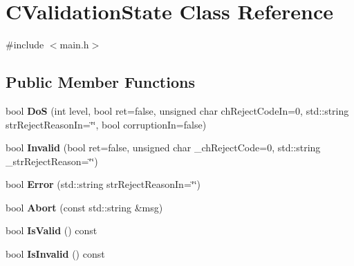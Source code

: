 \hypertarget{class_c_validation_state}{}\section{C\+Validation\+State Class Reference}
\label{class_c_validation_state}


{\ttfamily \#include $<$main.\+h$>$}

\subsection*{Public Member Functions}
\begin{DoxyCompactItemize}
\item 
\mbox{\label{class_c_validation_state_a3c6786d00da8d1c5df25b4c3876409e8}} 
bool {\bfseries DoS} (int level, bool ret=false, unsigned char ch\+Reject\+Code\+In=0, std\+::string str\+Reject\+Reason\+In=\char`\"{}\char`\"{}, bool corruption\+In=false)
\item 
\mbox{\label{class_c_validation_state_a88ff08b67f7f44bb3c7f7053bb1ee6fc}} 
bool {\bfseries Invalid} (bool ret=false, unsigned char \+\_\+ch\+Reject\+Code=0, std\+::string \+\_\+str\+Reject\+Reason=\char`\"{}\char`\"{})
\item 
\mbox{\label{class_c_validation_state_abf67ad56f62df5679d47c289684c554c}} 
bool {\bfseries Error} (std\+::string str\+Reject\+Reason\+In=\char`\"{}\char`\"{})
\item 
\mbox{\label{class_c_validation_state_a6788cb521cf538ac80413a1c6c3da5e8}} 
bool {\bfseries Abort} (const std\+::string \&msg)
\item 
\mbox{\label{class_c_validation_state_a7dc31c88ba63ad17a954f247d21b550c}} 
bool {\bfseries Is\+Valid} () const
\item 
\mbox{\label{class_c_validation_state_ace1d536f4003d3a6689fccd0f496c977}} 
bool {\bfseries Is\+Invalid} () const
\item 
\mbox{\label{class_c_validation_state_aeac85935d695254422bc5f2db8a5516b}} 

\end{DoxyCompactItemize}
